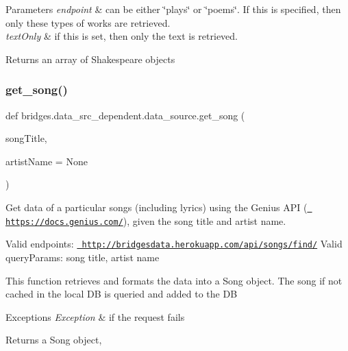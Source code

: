 \begin{DoxyParams}{Parameters}
{\em endpoint} & can be either \char`\"{}plays\char`\"{} or \char`\"{}poems\char`\"{}. If this is specified, then only these types of works are retrieved. \\
\hline
{\em text\+Only} & if this is set, then only the text is retrieved.\\
\hline
\end{DoxyParams}
\begin{DoxyReturn}{Returns}
an array of Shakespeare objects 
\end{DoxyReturn}
\mbox{\label{namespacebridges_1_1data__src__dependent_1_1data__source_a060ab8ec1777a5458a37d5e01e594e82}} 
\subsubsection{\texorpdfstring{get\_song()}{get\_song()}}
{\footnotesize\ttfamily def bridges.\+data\+\_\+src\+\_\+dependent.\+data\+\_\+source.\+get\+\_\+song (\begin{DoxyParamCaption}\item[{}]{song\+Title,  }\item[{}]{artist\+Name = {\ttfamily None} }\end{DoxyParamCaption})}



Get data of a particular songs (including lyrics) using the Genius A\+PI (\href{https://docs.genius.com/}{\texttt{ https\+://docs.\+genius.\+com/}}), given the song title and artist name. 

Valid endpoints\+: \href{http://bridgesdata.herokuapp.com/api/songs/find/}{\texttt{ http\+://bridgesdata.\+herokuapp.\+com/api/songs/find/}} Valid query\+Params\+: song title, artist name

This function retrieves and formats the data into a Song object. The song if not cached in the local DB is queried and added to the DB


\begin{DoxyExceptions}{Exceptions}
{\em Exception} & if the request fails\\
\hline
\end{DoxyExceptions}
\begin{DoxyReturn}{Returns}
a Song object, 
\end{DoxyReturn}
\mbox{\label{namespacebridges_1_1data__src__dependent_1_1data__source_abf7f1f53dc13383fa296cb597e4a7ee0}} 
